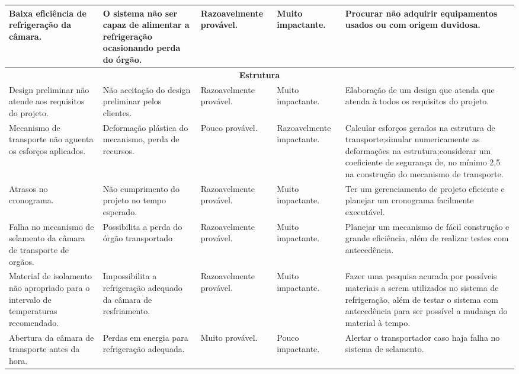\begin{longtable}{|m{2.8cm}|m{4cm}|m{2.5cm}|m{2.2cm}|m{4cm}|}
Baixa eficiência de refrigeração da câmara. & O sistema não ser capaz de alimentar a refrigeração ocasionando perda do órgão. & Razoavelmente provável. & Muito impactante. & Procurar não adquirir equipamentos usados ou com origem duvidosa.


\\ \hline



\multicolumn{5}{|c|}{\textbf{Estrutura}}\tabularnewline
\hline

Design preliminar não atende aos requisitos do projeto. & Não aceitação do design preliminar pelos clientes. & Razoavelmente provável. & Muito impactante. & Elaboração de um design que atenda que atenda à todos os requisitos do projeto. \\ \hline

Mecanismo de transporte não aguenta os esforços aplicados. & Deformação plástica do mecanismo, perda de recursos. & Pouco provável. & Razoavelmente impactante. & Calcular esforços gerados na estrutura de transporte;simular numericamente as deformações na estrutura;considerar um coeficiente de segurança de, no mínimo 2,5 na construção do mecanismo de transporte. \\ \hline

Atrasos no cronograma. & Não cumprimento do projeto no tempo esperado. & Razoavelmente provável. & Muito impactante. & Ter um gerenciamento de projeto eficiente e planejar um cronograma facilmente executável. \\ \hline

Falha no mecanismo de selamento da câmara de transporte de orgãos. & Possibilita a perda do órgão transportado & Razoavelmente provável. & Muito impactante. & Planejar um mecanismo de fácil construção e grande eficiência, além de realizar testes com antecedência. \\ \hline

Material de isolamento não apropriado para o intervalo de temperaturas recomendado. & Impossibilita a refrigeração adequado da câmara de resfriamento. & Razoavelmente provável. & Muito impactante. & Fazer uma pesquisa acurada por possíveis materiais a serem utilizados no sistema de refrigeração, além de testar o sistema com antecedência para ser  possível a mudança do material à tempo. \\ \hline

Abertura da câmara de transporte antes da hora. & Perdas em energia para refrigeração adequada. & Muito provável. & Pouco impactante. & Alertar o transportador caso haja falha no sistema de selamento. \\ \hline


\end{longtable}
